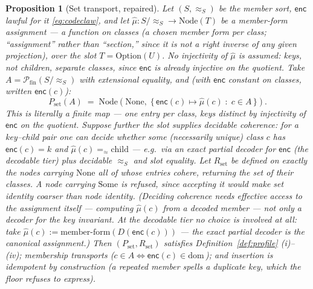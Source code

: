 \documentclass[11pt]{article}
\newtheorem{proposition}[theorem]{Proposition}
\theoremstyle{definition}
\newcommand{\NodeT}[1]{\mathrm{Node}(#1)}
\newcommand{\dom}{\mathrm{dom}\,}
\newcommand{\eqS}{=_{\approx}}                     %
\newcommand{\enc}{\mathsf{enc}}
\begin{document}
\begin{proposition}[Set transport, repaired]\label{prop:set-transport}
Let $(S, \approx_S)$ be the member sort, $\enc$ lawful for it
\eqref{eq:codeclaw}, and let $\hat\mu : S/\!\approx_S \to \NodeT{T}$ be a
\emph{member-form assignment} --- a function on classes (a chosen member form per
class; ``assignment'' rather than ``section,'' since it is not a right inverse of any
given projection), over the slot $T = \mathrm{Option}(U)$. No injectivity of $\hat\mu$ is
assumed: keys, not children,
separate classes, since $\enc$ is already injective on the quotient. Take
$A = \mathcal{P}_{\mathrm{fin}}(S/\!\approx_S)$ with extensional equality, and (with
$\enc$ constant on classes, written $\enc(c)$):
\[
P_{\mathrm{set}}(A) \;=\; \mathrm{Node}(\mathrm{None},\; \{\, \enc(c) \mapsto \hat\mu(c) \;:\; c \in A \,\}).
\]
This is literally a finite map --- one entry per class, keys distinct by injectivity
of $\enc$ on the quotient. Suppose further the slot supplies \emph{decidable
coherence}: for a key--child pair one can decide whether some (necessarily unique)
class $c$ has $\enc(c) = k$ and $\hat\mu(c) \eqS \text{child}$ --- e.g.\ via an exact
partial decoder for $\enc$ (the decodable tier) plus decidable $\approx_S$ and slot
equality. Let $R_{\mathrm{set}}$ be defined on exactly the nodes carrying $\mathrm{None}$
all of whose entries cohere, returning the set of their classes. A node carrying
$\mathrm{Some}$ is refused, since accepting it would make set identity coarser than node
identity. (Deciding coherence needs
effective access to the assignment itself --- computing $\hat\mu(c)$ from a decoded
member --- not only a decoder for the key invariant. At the decodable tier no choice
is involved at all: take $\hat\mu(c) := \text{member-form}(D(\enc(c)))$ --- the
exact partial decoder \emph{is} the canonical assignment.) Then
$(P_{\mathrm{set}}, R_{\mathrm{set}})$ satisfies Definition~\ref{def:profile}
(i)--(iv); membership transports ($c \in A \iff \enc(c) \in \dom$); and insertion is
idempotent by construction (a repeated member spells a duplicate key, which the floor
refuses to express).
\end{proposition}
\end{document}
